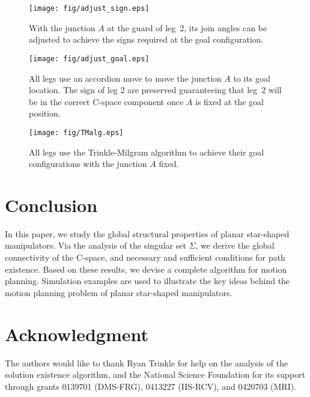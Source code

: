 \documentclass[twocolumn]{IEEEtran}
\begin{document}
\begin{figure}
  \centering
  \texttt{[image: fig/adjust\_sign.eps]}
  \caption{With the junction $A$ at the guard of
  leg~2, its join angles can be adjusted to achieve the signs required
  at the goal configuration.}
  \label{adjust_sign}
\end{figure}

\begin{figure}
  \centering
  \texttt{[image: fig/adjust\_goal.eps]}
  \caption{All legs use an accordion move to move the junction $A$ to its
  goal location.  The sign of leg 2 are preserved guaranteeing
  that leg~2 will be in the correct C-space component once $A$ is fixed at
  the goal position.}
  \label{accordion_goal}
\end{figure}

\begin{figure}
  \centering
  \texttt{[image: fig/TMalg.eps]}
  \caption{All legs use the Trinkle-Milgram algorithm to achieve their
  goal configurations with the junction $A$ fixed.}
  \label{TMalg}
\end{figure}

\section{Conclusion}
In this paper, we study the global structural properties of planar star-shaped
manipulators. Via the analysis of the singular set $\Sigma$,
we derive the global connectivity of the C-space, and necessary and sufficient conditions
for path existence. Based on these results, we devise a complete algorithm for motion planning.
Simulation examples are used to illustrate the key ideas behind the motion planning problem
of planar star-shaped manipulators.



\section*{Acknowledgment}
The authors would like to thank Ryan Trinkle for
help on the analysis of the solution existence algorithm, and the
National Science Foundation for its support through grants 0139701
(DMS-FRG), 0413227 (IIS-RCV), and 0420703 (MRI).
\end{document}
